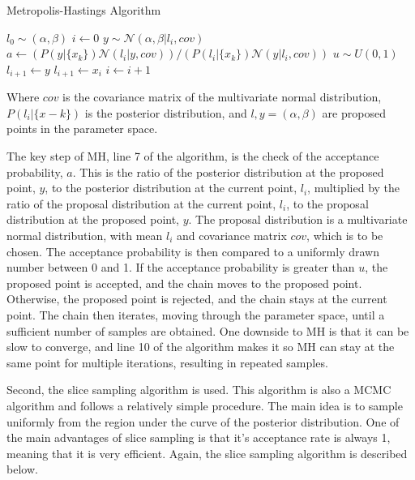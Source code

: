 \documentclass[12pt]{report} %
\begin{document}
\begin{definitionbox}{Metropolis-Hastings Algorithm}
    \begin{algorithmic}[1]
        \State $l_{0} \sim (\alpha, \beta)$ 
        \State $i \gets 0$
         
            \State $y \sim \mathcal{N}(\alpha, \beta | l_{i}, cov)$ 
            \State $a \gets (P(y|\{x_{k}\})\mathcal{N}(l_{i}|y, cov))/(P(l_{i}|\{x_{k}\})\mathcal{N}(y|l_{i}, cov))$ 
            \State $u \sim U(0, 1)$ 
                \State $l_{i+1} \gets y$ 
            \Else
                \State $l_{i+1} \gets x_{i}$ 
            \EndIf
            \State $i \gets i + 1$
        \EndWhile
        \end{algorithmic}
    Where $cov$ is the covariance matrix of the multivariate normal distribution, $P(l_{i}|\{x-{k}\})$ is the posterior distribution, and $l, y = (\alpha, \beta)$ are proposed points in the parameter space.
\end{definitionbox}

\vspace*{1\baselineskip}
The key step of MH, line 7 of the algorithm, is the check of the acceptance probability, $a$. This is the ratio of the posterior distribution at the proposed point, $y$, to the posterior distribution at the current point, $l_{i}$, multiplied by the ratio of the proposal distribution at the current point, $l_{i}$, to the proposal distribution at the proposed point, $y$. The proposal distribution is a multivariate normal distribution, with mean $l_{i}$ and covariance matrix $cov$, which is to be chosen. The acceptance probability is then compared to a uniformly drawn number between 0 and 1. If the acceptance probability is greater than $u$, the proposed point is accepted, and the chain moves to the proposed point. Otherwise, the proposed point is rejected, and the chain stays at the current point. The chain then iterates, moving through the parameter space, until a sufficient number of samples are obtained. One downside to MH is that it can be slow to converge, and line 10 of the algorithm makes it so MH can stay at the same point for multiple iterations, resulting in repeated samples.


Second, the slice sampling algorithm is used. This algorithm is also a MCMC algorithm and follows a relatively simple procedure. The main idea is to sample uniformly from the region under the curve of the posterior distribution. One of the main advantages of slice sampling is that it's acceptance rate is always 1, meaning that it is very efficient. Again, the slice sampling algorithm is described below.
\end{document}

